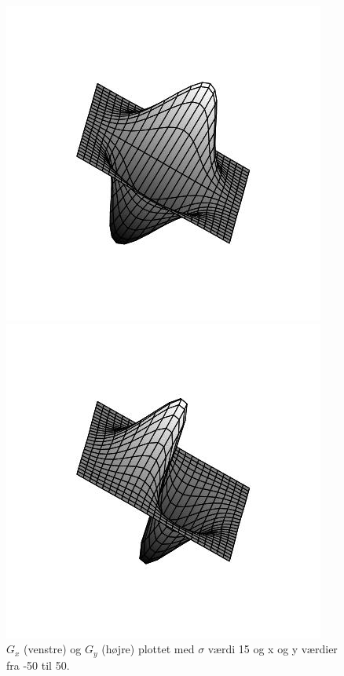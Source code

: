 \begin{figure}[H]
	\begin{minipage}[b]{0.5\linewidth}
		\includegraphics[scale=0.6]{files/premethod/img/g_x.jpg}
	\end{minipage}
	\hspace{0.5cm}
	\begin{minipage}[b]{0.5\linewidth}
		\includegraphics[scale=0.6]{files/premethod/img/g_y.jpg}
	\end{minipage}
	\caption{$G_x$ (venstre) og $G_y$ (højre) plottet med $\sigma$ værdi 15 og x og y værdier fra -50 til 50.\label{fig:premethod_gxgy}}
\end{figure}

